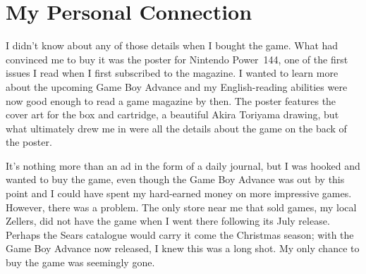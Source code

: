 \documentclass{book}
\let\oldcenter\center
\let\oldendcenter\endcenter
\renewenvironment{center}{\setlength\topsep{0pt}\oldcenter}{\oldendcenter}
\begin{document}
\FloatBarrier\needspace{10mm}\section*{My Personal Connection}\nopagebreak[4]

I didn’t know about any of those details when I bought the game. What had convinced me to buy it was the poster for Nintendo Power 144, one of the first issues I read when I first subscribed to the magazine. I wanted to learn more about the upcoming Game Boy Advance and my English-reading abilities were now good enough to read a game magazine by then. The poster features the cover art for the box and cartridge, a beautiful Akira Toriyama drawing, but what ultimately drew me in were all the details about the game on the back of the poster.

\begin{center}
\vspace{8pt}
\quad\vspace{4pt}
\quad\vspace{4pt}
\quad\vspace{4pt}
\end{center}

It’s nothing more than an ad in the form of a daily journal, but I was hooked and wanted to buy the game, even though the Game Boy Advance was out by this point and I could have spent my hard-earned money on more impressive games. However, there was a problem. The only store near me that sold games, my local Zellers, did not have the game when I went there following its July release. Perhaps the Sears catalogue would carry it come the Christmas season; with the Game Boy Advance now released, I knew this was a long shot. My only chance to buy the game was seemingly gone.
\end{document}
